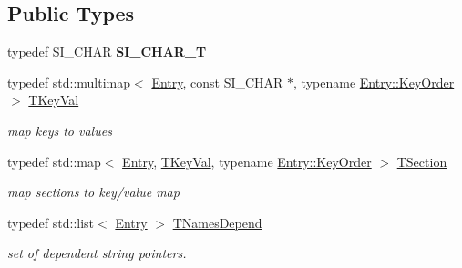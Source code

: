 \subsection*{Public Types}
\begin{DoxyCompactItemize}
\item 
typedef S\+I\+\_\+\+C\+H\+AR {\bfseries S\+I\+\_\+\+C\+H\+A\+R\+\_\+T}\hypertarget{class_c_simple_ini_templ_ad7ffad7e87da2303a05b885e95bc74fa}{}\label{class_c_simple_ini_templ_ad7ffad7e87da2303a05b885e95bc74fa}

\item 
typedef std\+::multimap$<$ \hyperlink{struct_c_simple_ini_templ_1_1_entry}{Entry}, const S\+I\+\_\+\+C\+H\+AR $\ast$, typename \hyperlink{struct_c_simple_ini_templ_1_1_entry_1_1_key_order}{Entry\+::\+Key\+Order} $>$ \hyperlink{class_c_simple_ini_templ_ae7f0e11d84617214bd479de6332c80e6}{T\+Key\+Val}\hypertarget{class_c_simple_ini_templ_ae7f0e11d84617214bd479de6332c80e6}{}\label{class_c_simple_ini_templ_ae7f0e11d84617214bd479de6332c80e6}

\begin{DoxyCompactList}\small\item\em map keys to values \end{DoxyCompactList}\item 
typedef std\+::map$<$ \hyperlink{struct_c_simple_ini_templ_1_1_entry}{Entry}, \hyperlink{class_c_simple_ini_templ_ae7f0e11d84617214bd479de6332c80e6}{T\+Key\+Val}, typename \hyperlink{struct_c_simple_ini_templ_1_1_entry_1_1_key_order}{Entry\+::\+Key\+Order} $>$ \hyperlink{class_c_simple_ini_templ_a2e7963455f680abd0d6901786495a665}{T\+Section}\hypertarget{class_c_simple_ini_templ_a2e7963455f680abd0d6901786495a665}{}\label{class_c_simple_ini_templ_a2e7963455f680abd0d6901786495a665}

\begin{DoxyCompactList}\small\item\em map sections to key/value map \end{DoxyCompactList}\item 
typedef std\+::list$<$ \hyperlink{struct_c_simple_ini_templ_1_1_entry}{Entry} $>$ \hyperlink{class_c_simple_ini_templ_a391b3f3751e06cd9e9de4fb16ac14342}{T\+Names\+Depend}
\begin{DoxyCompactList}\small\item\em set of dependent string pointers. \end{DoxyCompactList}\end{DoxyCompactItemize}
